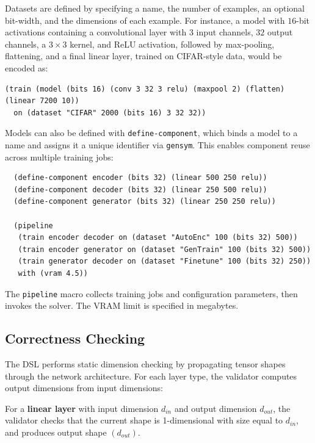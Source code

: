 \documentclass{nfr}
\begin{document}
Datasets are defined by specifying a name, the number of examples, an optional bit-width, and the dimensions of each example. For instance, a model with $16$-bit activations containing a convolutional layer with $3$ input channels, $32$ output channels, a $3 \times 3$ kernel, and ReLU activation, followed by max-pooling, flattening, and a final linear layer, trained on CIFAR-style data, would be encoded as:

\lstset{language=lisp}
\begin{lstlisting}
(train (model (bits 16) (conv 3 32 3 relu) (maxpool 2) (flatten) (linear 7200 10))
  on (dataset "CIFAR" 2000 (bits 16) 3 32 32))
\end{lstlisting}

Models can also be defined with \texttt{define-component}, which binds a model to a name and assigns it a unique identifier via \texttt{gensym}. This enables component reuse across multiple training jobs:

\lstset{language=lisp}
\begin{lstlisting}
  (define-component encoder (bits 32) (linear 500 250 relu))
  (define-component decoder (bits 32) (linear 250 500 relu))
  (define-component generator (bits 32) (linear 250 250 relu))

  (pipeline
   (train encoder decoder on (dataset "AutoEnc" 100 (bits 32) 500))
   (train encoder generator on (dataset "GenTrain" 100 (bits 32) 500))
   (train generator decoder on (dataset "Finetune" 100 (bits 32) 250))
   with (vram 4.5))
\end{lstlisting}

The \texttt{pipeline} macro collects training jobs and configuration parameters, then invokes the solver. The VRAM limit is specified in megabytes.

\subsection{Correctness Checking}
The DSL performs static dimension checking by propagating tensor shapes through the network architecture. For each layer type, the validator computes output dimensions from input dimensions:

For a \textbf{linear layer} with input dimension $d_{in}$ and output dimension $d_{out}$, the validator checks that the current shape is 1-dimensional with size equal to $d_{in}$, and produces output shape $(d_{out})$.
\end{document}
